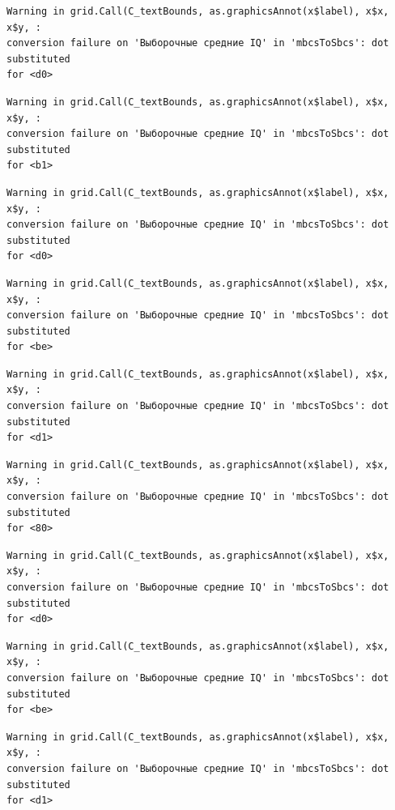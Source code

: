 \documentclass[
  letterpaper,
]{scrbook}
\theoremstyle{definition}
\theoremstyle{remark}
\begin{document}
\begin{verbatim}
Warning in grid.Call(C_textBounds, as.graphicsAnnot(x$label), x$x, x$y, :
conversion failure on 'Выборочные средние IQ' in 'mbcsToSbcs': dot substituted
for <d0>
\end{verbatim}

\begin{verbatim}
Warning in grid.Call(C_textBounds, as.graphicsAnnot(x$label), x$x, x$y, :
conversion failure on 'Выборочные средние IQ' in 'mbcsToSbcs': dot substituted
for <b1>
\end{verbatim}

\begin{verbatim}
Warning in grid.Call(C_textBounds, as.graphicsAnnot(x$label), x$x, x$y, :
conversion failure on 'Выборочные средние IQ' in 'mbcsToSbcs': dot substituted
for <d0>
\end{verbatim}

\begin{verbatim}
Warning in grid.Call(C_textBounds, as.graphicsAnnot(x$label), x$x, x$y, :
conversion failure on 'Выборочные средние IQ' in 'mbcsToSbcs': dot substituted
for <be>
\end{verbatim}

\begin{verbatim}
Warning in grid.Call(C_textBounds, as.graphicsAnnot(x$label), x$x, x$y, :
conversion failure on 'Выборочные средние IQ' in 'mbcsToSbcs': dot substituted
for <d1>
\end{verbatim}

\begin{verbatim}
Warning in grid.Call(C_textBounds, as.graphicsAnnot(x$label), x$x, x$y, :
conversion failure on 'Выборочные средние IQ' in 'mbcsToSbcs': dot substituted
for <80>
\end{verbatim}

\begin{verbatim}
Warning in grid.Call(C_textBounds, as.graphicsAnnot(x$label), x$x, x$y, :
conversion failure on 'Выборочные средние IQ' in 'mbcsToSbcs': dot substituted
for <d0>
\end{verbatim}

\begin{verbatim}
Warning in grid.Call(C_textBounds, as.graphicsAnnot(x$label), x$x, x$y, :
conversion failure on 'Выборочные средние IQ' in 'mbcsToSbcs': dot substituted
for <be>
\end{verbatim}

\begin{verbatim}
Warning in grid.Call(C_textBounds, as.graphicsAnnot(x$label), x$x, x$y, :
conversion failure on 'Выборочные средние IQ' in 'mbcsToSbcs': dot substituted
for <d1>
\end{verbatim}
\end{document}
